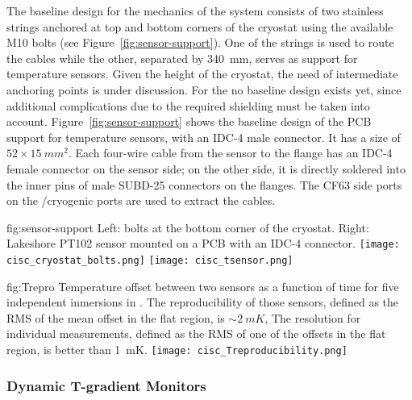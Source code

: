 The baseline design for the mechanics of the \single system consists of two stainless strings anchored at top and bottom corners of the cryostat
using the available M10 bolts (see Figure~\ref{fig:sensor-support}). One of the strings is used to route the cables while the other,
separated by \SI{340}{mm}, serves as support for temperature sensors.
Given the height of the cryostat, the need of intermediate anchoring points is under discussion. For the  no baseline design exists yet,
since additional complications due to the required \efield shielding must be taken into account. Figure~\ref{fig:sensor-support} shows the baseline design of the
PCB support for temperature sensors, with an IDC-4 male connector. It has a size of $52\times \SI{15}{mm^2}$. Each four-wire cable from the sensor to the flange has an IDC-4 female connector
on the sensor side; on the other side, it is directly soldered into the inner pins of male SUBD-25 connectors on the flanges. The CF63 side ports on the /cryogenic ports are 
used to extract the cables. 

\begin{dunefigure}{fig:sensor-support}
  {Left: bolts at the bottom corner of the cryostat. Right: Lakeshore PT102 sensor mounted on a PCB with an IDC-4 connector.}
  \texttt{[image: cisc\_cryostat\_bolts.png]}%
    \hspace{1cm}%
  \texttt{[image: cisc\_tsensor.png]}%
\end{dunefigure}


\begin{dunefigure}{fig:Trepro}
  {Temperature offset between two sensors as a function of time for five independent inmersions in \lar. The reproducibility of those sensors,
    defined as the RMS of the mean offset in the flat region, is $\sim \SI{2}{mK}$,
    The resolution for individual measurements, defined as the RMS of one of the offsets in the flat region, is better than \SI{1}{mK}.}
  \texttt{[image: cisc\_Treproducibility.png]}%
\end{dunefigure}


\subsubsection{Dynamic T-gradient Monitors}

